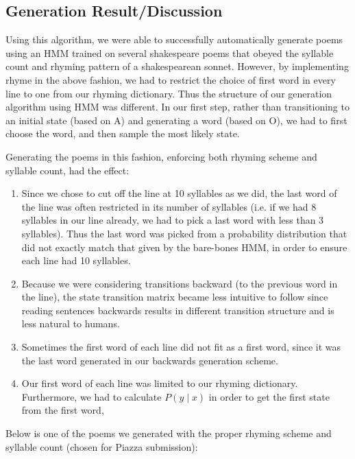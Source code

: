 \subsection*{Generation Result/Discussion}

Using this algorithm, we were able to successfully automatically generate poems using an HMM trained on several shakespeare poems that obeyed the syllable count and rhyming pattern of a shakespearean sonnet. However, by implementing rhyme in the above fashion, we had to restrict the choice of first word in every line to one from our rhyming dictionary. Thus the structure of our generation algorithm using HMM was different. In our first step, rather than transitioning to an initial state (based on A) and generating a word (based on O), we had to first choose the word, and then sample the most likely state.

Generating the poems in this fashion, enforcing both rhyming scheme and syllable count, had the effect:

\begin{enumerate}

\item Since we chose to cut off the line at 10 syllables as we did, the last word of the line was often restricted in its number of syllables (i.e. if we had 8 syllables in our line already, we had to pick a last word with less than 3 syllables). Thus the last word was picked from a probability distribution that did not exactly match that given by the bare-bones HMM, in order to ensure each line had 10 syllables.

\item Because we were considering transitions backward (to the previous word in the line), the state transition matrix became less intuitive to follow since reading sentences backwards results in different transition structure and is less natural to humans.

\item Sometimes the first word of each line did not fit as a first word, since it was the last word generated in our backwards generation scheme.

\item Our first word of each line was limited to our rhyming dictionary. Furthermore, we had to calculate $P(y \mid x)$ in order to get the first state from the first word, 

\end{enumerate}

Below is one of the poems we generated with the proper rhyming scheme and syllable count (chosen for Piazza submission):

